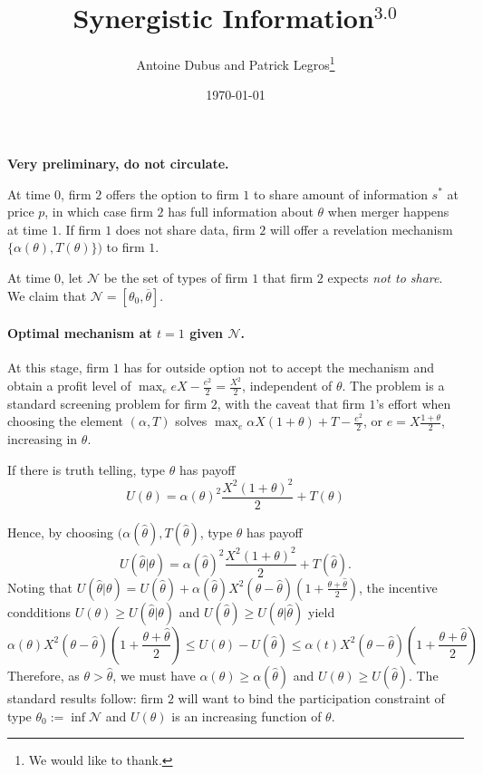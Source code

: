 \documentclass[a4paper]{article}
\newcommand{\N}{\mathcal N}
\renewcommand{\th}{\hat\theta}
\renewcommand{\t}{\theta}
\renewcommand{\a}{\alpha}
\begin{document}
\title{Synergistic Information$^{3.0}$}
\author{Antoine Dubus and Patrick Legros\thanks{We would like to thank.}}
\date{\today}


\maketitle

 
\textbf{Very preliminary, do not circulate.}

\baselineskip0.7cm


At time $0$, firm $2$ offers the option to firm $1$ to share amount of information $s^*$ at price $p$, in which case firm $2$ has full information about $\t$ when merger happens at time $1$. If firm $1$ does not share data, firm $2$ will offer a revelation mechanism $\{\alpha(\t),T(\t)\})$ to firm $1$.

At time $0$, let $\N$ be the set of types of firm $1$ that firm $2$ expects \emph{not to share}. We claim that $\N=[\t_0,\overline \t]$.
 
\paragraph{Optimal mechanism at $t=1$ given $\N$.} At this stage, firm $1$ has for outside option not to accept the mechanism and obtain a profit level of $\max_e eX -\frac{e^2}{2}=\frac{X^2}{2}$, independent of $\t$. The problem is a standard screening problem for firm $2$, with the caveat that firm $1$'s effort when choosing the element $(\alpha,T)$ solves $\max_e \alpha X(1+\t)+T-\frac{e^2}{2}$, or $e=X\frac{1+\t}{2}$, increasing in $\t$. 

If there is truth telling, type $\t$ has payoff
%
\[
U(\t)=\alpha(\t)^2 \frac{X^2(1+\t)^2}{2}+T(\t)
\]
%

Hence, by choosing $(\alpha(\th),T(\th)$, type $\t$ has payoff
%
\[
U(\th|\t)=\alpha(\th)^2 \frac{X^2(1+\t)^2}{2}+T(\th).
\]
%
Noting that $U(\th|\t)=U(\th)+\a(\th)X^2(\t-\th)\left(1+\frac{\t+\th}{2}\right)$, the incentive condditions $U(\t)\geq U(\th|\t)$ and $U(\th)\geq U(\t|\th)$ yield
%
\[
\a(\t) X^2(\t-\th)\left(1+\frac{\t+\th}{2}\right)   \leq U(\t)-U(\th) \leq \a(t)X^2(\t-\th)\left(1+\frac{\t+\th}{2}\right) 
\]
%
Therefore, as $\t>\th$, we must have $\a(\t)\geq \a(\th)$ and $U(\t)\geq U(\th)$.  The standard results follow: firm $2$ will want to bind the participation constraint of type $\t_0:=\inf \N$ and $U(\t)$ is an increasing function of $\t$.
\end{document}
